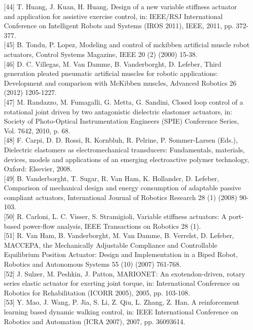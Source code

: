 \documentclass[10pt]{article}
\begin{document}
[44] T. Huang, J. Kuan, H. Huang, Design of a new variable stiffness actuator and application for assistive exercise control, in: IEEE/RSJ International Conference on Intelligent Robots and Systems (IROS 2011), IEEE, 2011, pp. 372-377.\\[0pt]
[45] B. Tondu, P. Lopez, Modeling and control of mckibben artificial muscle robot actuators, Control Systems Magazine, IEEE 20 (2) (2000) 15-38.\\[0pt]
[46] D. C. Villegas, M. Van Damme, B. Vanderborght, D. Lefeber, Third generation pleated pneumatic artificial muscles for robotic applications: Development and comparison with McKibben muscles, Advanced Robotics 26 (2012) 1205-1227.\\[0pt]
[47] M. Randazzo, M. Fumagalli, G. Metta, G. Sandini, Closed loop control of a rotational joint driven by two antagonistic dielectric elastomer actuators, in: Society of Photo-Optical Instrumentation Engineers (SPIE) Conference Series, Vol. 7642, 2010, p. 68.\\[0pt]
[48] F. Carpi, D. D. Rossi, R. Kornbluh, R. Pelrine, P. Sommer-Larsen (Eds.), Dielectric elastomers as electromechanical transducers: Fundamentals, materials, devices, models and applications of an emerging electroactive polymer technology, Oxford: Elsevier, 2008.\\[0pt]
[49] B. Vanderborght, T. Sugar, R. Van Ham, K. Hollander, D. Lefeber, Comparison of mechanical design and energy consumption of adaptable passive compliant actuators, International Journal of Robotics Research 28 (1) (2008) 90-103.\\[0pt]
[50] R. Carloni, L. C. Visser, S. Stramigioli, Variable stiffness actuators: A port-based power-flow analysis, IEEE Transactions on Robotics 28 (1).\\[0pt]
[51] R. Van Ham, B. Vanderborght, M. Van Damme, B. Verrelst, D. Lefeber, MACCEPA, the Mechanically Adjustable Compliance and Controllable Equilibrium Position Actuator: Design and Implementation in a Biped Robot, Robotics and Autonomous Systems 55 (10) (2007) 761-768.\\[0pt]
[52] J. Sulzer, M. Peshkin, J. Patton, MARIONET: An exotendon-driven, rotary series elastic actuator for exerting joint torque, in: International Conference on Robotics for Rehabilitation (ICORR 2005), 2005, pp. 103-108.\\[0pt]
[53] Y. Mao, J. Wang, P. Jia, S. Li, Z. Qiu, L. Zhang, Z. Han, A reinforcement learning based dynamic walking control, in: IEEE International Conference on Robotics and Automation (ICRA 2007), 2007, pp. 36093614.\\[0pt]
\end{document}
